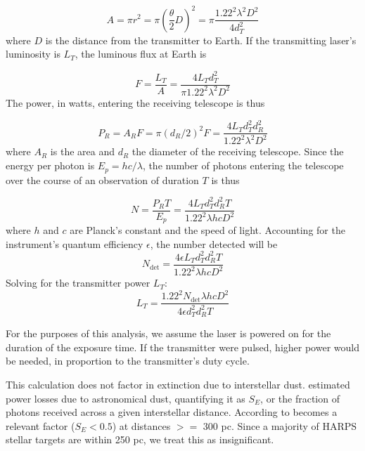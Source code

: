 \documentclass[twocolumn]{aastex701}
\begin{document}
\begin{equation}
    A = \pi r^2 = \pi (\frac{\theta}{2} D)^2 = \pi \frac{1.22^2 \lambda^2 D^2}{4d_T^2}
\end{equation}
where $D$ is the distance from the transmitter to Earth.  If the transmitting laser's luminosity is $L_T$, the luminous flux at Earth is

\begin{equation}
    F = \frac{L_T}{A} = \frac{4L_T d_T^2}{\pi 1.22^2 \lambda^2D^2}
\end{equation}
The power, in watts, entering the receiving telescope is thus

\begin{equation}
    P_R = A_R F = \pi (d_R/2)^2 F = \frac{4L_T d_T^2 d_R^2}{1.22^2 \lambda^2 D^2}
\end{equation}
where $A_R$ is the area and $d_R$ the diameter of the receiving telescope.  Since the energy per photon is $E_p = h c / \lambda$, the number of photons entering the telescope over the course of an observation of duration $T$ is thus

\begin{equation}
    N = \frac{P_R T}{E_p} = \frac{4L_Td_T^2 d_R^2 T}{1.22^2 \lambda h c D^2}
\end{equation}
where $h$ and $c$ are Planck's constant and the speed of light.  Accounting for the instrument's quantum efficiency $\epsilon$, the number detected will be
\begin{equation}
    \label{eq:transpower}
    N_{\mbox{det}} = \frac{4\epsilon L_T d_T^2 d_R^2 T}{1.22^2 \lambda h c D^2}
\end{equation}
Solving for the transmitter power $L_T$:
\begin{equation}
    L_T = \frac{1.22^2 N_{\mbox{det}} \lambda h c D^2}{4\epsilon d_T^2 d_R^2 T}
\end{equation}

For the purposes of this analysis, we assume the laser is powered on for the duration of the exposure time. If the transmitter were pulsed, higher power would be needed, in proportion to the transmitter's duty cycle. 

This calculation does not factor in extinction due to interstellar dust.  \cite{Hippke_2018} estimated power losses due to astronomical dust, quantifying it as $S_E$, or the fraction of photons received across a given interstellar distance. According to \citep{Hippke_2018} becomes a relevant factor ($S_E< 0.5$)  at distances $>=$ 300 pc. Since a majority of HARPS stellar targets are within 250 pc, we treat this as insignificant.
\end{document}
